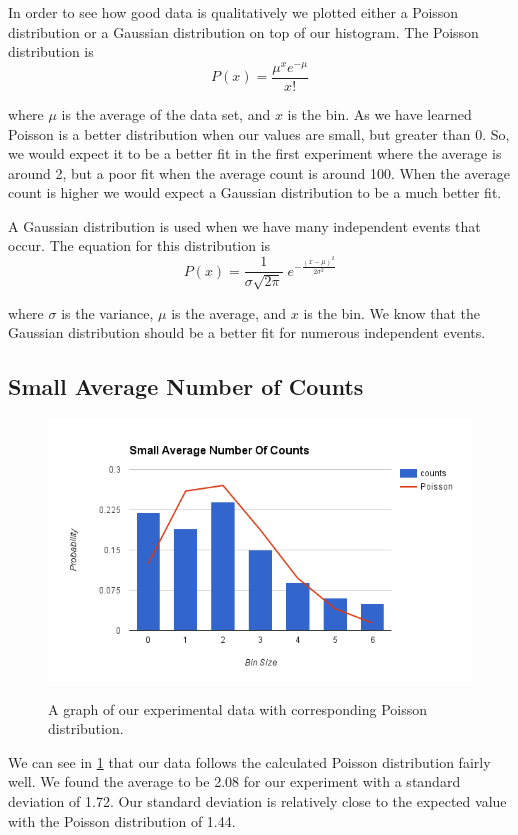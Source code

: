 \documentclass[12pt letterpaper]{article}
\begin{document}
In order to see how good data is qualitatively we plotted either a Poisson distribution or a Gaussian distribution on top of our histogram. The Poisson distribution is 
\begin{equation}
\label{eq:poisson}
P(x) = \frac{\mu^x e^{- \mu}}{x!}
\end{equation}

where $\mu$ is the average of the data set, and $x$ is the bin. As we have learned Poisson is a better distribution when our values are small, but greater than 0. So, we would expect it to be a better fit in the first experiment where the average is around 2, but a poor fit when the average count is around 100. When the average count is higher we would expect a Gaussian distribution to be a much better fit. 

A Gaussian distribution is used when we have many independent events that occur. The equation for this distribution is 
\begin{equation}
P(x) = \frac{1}{\sigma\sqrt{2\pi} } \; e^{ -\frac{(x-\mu)^2}{2\sigma^2} }
\end{equation}

where $\sigma$ is the variance, $\mu$ is the average, and $x$ is the bin. We know that the Gaussian distribution should be a better fit for numerous independent events. 

\subsection*{Small Average Number of Counts}

\begin{figure}[H]
  \caption{A graph of our experimental data with corresponding Poisson distribution.}
  \centering
    \includegraphics[width=.75\textwidth]{section1_1_1.png}
    \label{fig:section1.1.1}
\end{figure}

We can see in \ref{fig:section1.1.1} that our data follows the calculated Poisson distribution fairly well. We found the average to be 2.08 for our experiment with a standard deviation of 1.72. Our standard deviation is relatively close to the expected value with the Poisson distribution of 1.44. 
\end{document}
